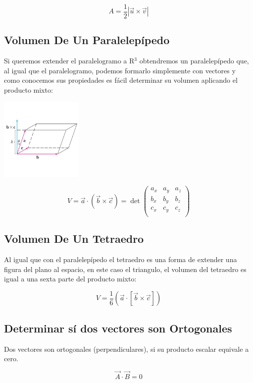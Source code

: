 \documentclass{article}
\begin{document}
\[
A = \frac{1}{2}|\vec{u}\times\vec{v}|
\]

\subsection{Volumen De Un Paralelepípedo}
\label{sec:orgb6f29c2}
Si queremos extender el paralelogramo a R\(^{\text{3}}\) obtendremos un paralelepípedo que, al igual que el paralelogramo, podemos formarlo simplemente con vectores y como conocemos sus propiedades es fácil determinar su volumen aplicando el producto mixto:

\begin{center}
\includegraphics[width=4cm]{img/paralelipedo.png}
\end{center}

\[
V = \vec{a}\cdot(\vec{b}\times\vec{c}) = \det\begin{pmatrix}
  a_x & a_y & a_z \\
  b_x & b_y & b_z \\
  c_x & c_y & c_z \\
\end{pmatrix}
\]

\subsection{Volumen De Un Tetraedro}
\label{sec:orgef5cede}
Al igual que con el paralelepípedo el tetraedro es una forma de extender una figura del plano al espacio, en este caso el triangulo, el volumen del tetraedro es igual a una sexta parte del producto mixto:

\[
V = \frac{1}{6} \left( \vec{a}\cdot\left[\vec{b}\times\vec{c}\right] \right)
\]

\subsection{Determinar sí dos vectores son Ortogonales}
\label{sec:orgcc74a28}
Dos vectores son ortogonales (perpendiculares), si su producto escalar equivale a cero.

\[
\vec{A} \cdot \vec{B} = 0
\]
\end{document}
